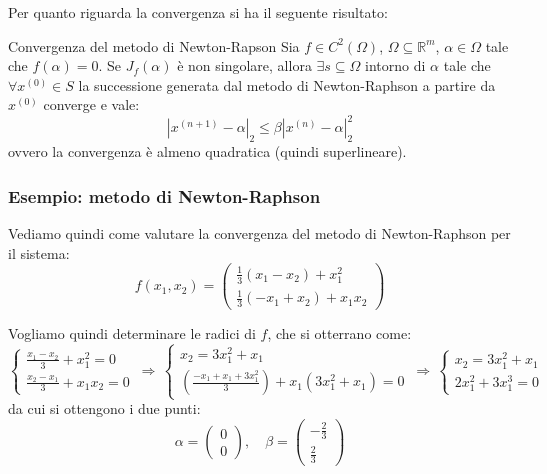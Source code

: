 \documentclass[a4paper,11pt]{article}
\begin{document}
Per quanto riguarda la convergenza si ha il seguente risultato:
\begin{theorem}{Convergenza del metodo di Newton-Rapson}
	Sia $f \in C^2(\Omega)$, $\Omega \subseteq \mathbb{R}^m$, $\alpha \in \Omega$ tale che $f(\alpha) = 0$.
	Se $J_f(\alpha)$ è non singolare, allora $\exists s \subseteq \Omega$ intorno di $\alpha$ tale che $\forall x^{(0)} \in S$ la successione generata dal metodo di Newton-Raphson a partire da $x^{(0)}$ converge e vale:
	$$
	|x^{(n + 1)} - \alpha|_2 \leq \beta |x^{(n)} - \alpha |_2^2
	$$
	ovvero la convergenza è almeno quadratica (quindi superlineare).
\end{theorem}

\subsubsection{Esempio: metodo di Newton-Raphson}
Vediamo quindi come valutare la convergenza del metodo di Newton-Raphson per il sistema:
$$
f(x_1, x_2) =
\begin{pmatrix}
	\frac{1}{3} (x_1 - x_2) + x_1^2 \\
	\frac{1}{3} (-x_1 + x_2) + x_1 x_2
\end{pmatrix}
$$

\par\smallskip

Vogliamo quindi determinare le radici di $f$, che si otterrano come:
\[
	\begin{cases}
		\frac{x_1 - x_2}{3} + x_1^2 = 0 \\
		\frac{x_2 - x_1}{3} + x_1 x_2 = 0
	\end{cases}
	\, \Rightarrow \,
	\begin{cases}
		x_2 = 3 x_1^2 + x_1 \\
		\left( \frac{- x_1 + x_1 + 3 x_1^2}{3} \right) + x_1 (3 x_1^2 + x_1) = 0
	\end{cases}
	\, \Rightarrow \,
	\begin{cases}
		x_2 = 3 x_1^2 + x_1 \\
		2x_1^2 + 3x_1^3 = 0
	\end{cases}
\]
da cui si ottengono i due punti:
$$
\alpha = \begin{pmatrix}
0 \\ 0
\end{pmatrix}, \quad
\beta = \begin{pmatrix}
	-\frac{2}{3} \\ \frac{2}{3}
\end{pmatrix}
$$
\end{document}
